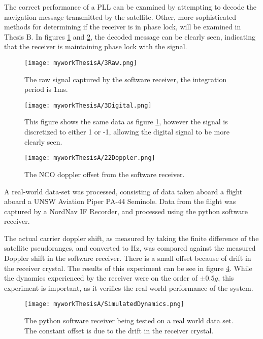 The correct performance of a \ac{PLL} can be examined by attempting to decode the navigation message transmitted by the satellite. Other, more sophisticated methods for determining if the receiver is in phase lock, will be examined in Thesis B. In figures \ref{fig:RawSignal} and \ref{fig:DigitalSignal}, the decoded message can be clearly seen, indicating that the receiver is maintaining phase lock with the signal.

\begin{figure}[!htb] 
    \centering
    \texttt{[image: myworkThesisA/3Raw.png]} 
    \caption{The raw signal captured by the software receiver, the integration period is 1ms.}
    \label{fig:RawSignal}
\end{figure}


\begin{figure}[!htb] 
    \centering
    \texttt{[image: myworkThesisA/3Digital.png]} 
    \caption{This figure shows the same data as figure \ref{fig:RawSignal}, however the signal is discretized to either 1 or -1, allowing the digital signal to be more clearly seen.}
    \label{fig:DigitalSignal}
\end{figure}


\begin{figure}[!htb] 
    \centering
    \texttt{[image: myworkThesisA/22Doppler.png]} 
    \caption{The \ac{NCO} doppler offset from the software receiver.}
    \label{fig:Doppler}
\end{figure}


A real-world data-set was processed, consisting of data taken aboard a flight aboard a UNSW Aviation Piper PA-44 Seminole. Data from the flight was captured by a NordNav IF Recorder, and processed using the python software receiver. 

The actual carrier doppler shift, as measured by taking the finite difference of the satellite pseudoranges, and converted to Hz, was compared against the measured Doppler shift in the software receiver. There is a small offset because of drift in the receiver crystal. The results of this experiment can be see in figure \ref{fig:SimulatedDynamics}. While the dynamics experienced by the receiver were on the order of $\pm 0.5g$, this experiment is important, as it verifies the real world performance of the system. 

\begin{figure}[!htb] 
    \centering
    \texttt{[image: myworkThesisA/SimulatedDynamics.png]} 
    \caption{The python software receiver being tested on a real world data set. The constant offset is due to the drift in the receiver crystal.}
    \label{fig:SimulatedDynamics}
\end{figure}


